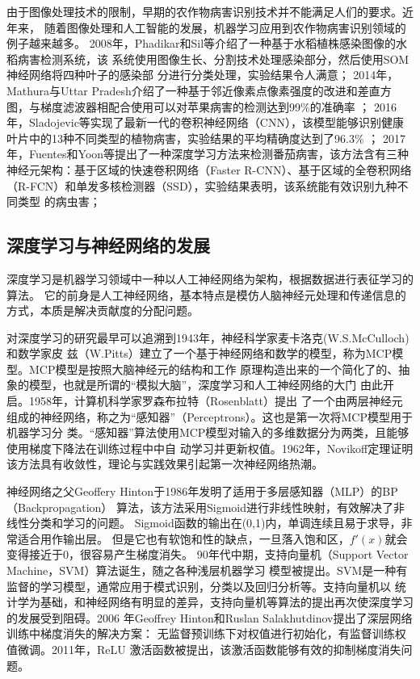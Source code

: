     由于图像处理技术的限制，早期的农作物病害识别技术并不能满足人们的要求。近年来，
    随着图像处理和人工智能的发展，机器学习应用到农作物病害识别领域的例子越来越多。
    2008年，Phadikar和Sil等介绍了一种基于水稻植株感染图像的水稻病害检测系统，该
    系统使用图像生长、分割技术处理感染部分，然后使用SOM神经网络将四种叶子的感染部
    分进行分类处理，实验结果令人满意\cite{phadikar2008rice}；
    2014年，Mathura与Uttar Pradesh介绍了一种基于邻近像素点像素强度的改进和差直方
    图，与梯度滤波器相配合使用可以对苹果病害的检测达到99\%的准确率 \cite{dubey2014fruit}；
    2016年，Sladojevic等实现了最新一代的卷积神经网络（CNN），该模型能够识别健康
    叶片中的13种不同类型的植物病害，实验结果的平均精确度达到了96.3\% \cite{sladojevic2016deep}；
    2017年，Fuentes和Yoon等提出了一种深度学习方法来检测番茄病害，该方法含有三种
    神经元架构：基于区域的快速卷积网络（Faster R-CNN）、基于区域的全卷积网络
    （R-FCN）和单发多核检测器（SSD），实验结果表明，该系统能有效识别九种不同类型
    的病虫害\cite{fuentes2017robust}；

\subsection{\hei\xiaosan\textbf{深度学习与神经网络的发展}}
  深度学习是机器学习领域中一种以人工神经网络为架构，根据数据进行表征学习的算法。
  它的前身是人工神经网络，基本特点是模仿人脑神经元处理和传递信息的方式，本质是解决贡献度的分配问题。

  对深度学习的研究最早可以追溯到1943年，神经科学家麦卡洛克(W.S.McCulloch)和数学家皮
  兹（W.Pitts）建立了一个基于神经网络和数学的模型，称为MCP模型。MCP模型是按照大脑神经元的结构和工作
  原理构造出来的一个简化了的、抽象的模型，也就是所谓的“模拟大脑”，深度学习和人工神经网络的大门
  由此开启\cite{mcculloch1990logical}。1958年，计算机科学家罗森布拉特（Rosenblatt）提出
  了一个由两层神经元组成的神经网络，称之为“感知器”（Perceptrons）。这也是第一次将MCP模型用于机器学习分
  类。“感知器”算法使用MCP模型对输入的多维数据分为两类，且能够使用梯度下降法在训练过程中中自
  动学习并更新权值。1962年，Novikoff定理证明该方法具有收敛性，理论与实践效果引起第一次神经网络热潮。

  神经网络之父Geoffery Hinton于1986年发明了适用于多层感知器（MLP）的BP（Backpropagation）
  算法，该方法采用Sigmoid进行非线性映射，有效解决了非线性分类和学习的问题。
  Sigmoid函数的输出在(0,1)内，单调连续且易于求导，非常适合用作输出层。
  但是它也有软饱和性的缺点，一旦落入饱和区，$f'(x)$就会变得接近于0，很容易产生梯度消失。
  90年代中期，支持向量机（Support Vector Machine，SVM）算法诞生，随之各种浅层机器学习
  模型被提出。SVM是一种有监督的学习模型，通常应用于模式识别，分类以及回归分析等。支持向量机以
  统计学为基础，和神经网络有明显的差异，支持向量机等算法的提出再次使深度学习的发展受到阻碍。2006
  年Geoffrey Hinton和Ruslan Salakhutdinov提出了深层网络训练中梯度消失的解决方案：
  无监督预训练下对权值进行初始化，有监督训练权值微调\cite{hinton2006reducing}。2011年，ReLU
  激活函数被提出，该激活函数能够有效的抑制梯度消失问题。

